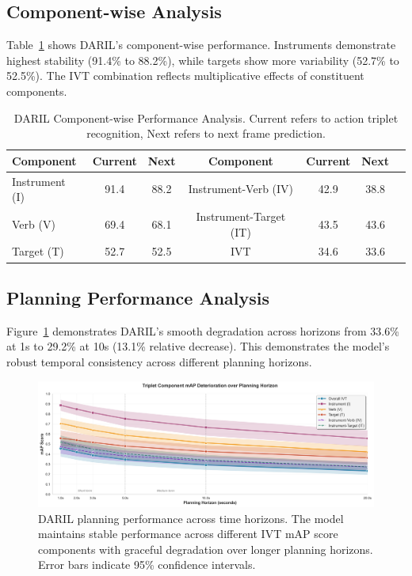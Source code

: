 \documentclass[runningheads]{llncs}
\begin{document}
\subsection{Component-wise Analysis}

Table~\ref{tab:component_analysis} shows DARIL's component-wise performance. Instruments demonstrate highest stability (91.4\% to 88.2\%), while targets show more variability (52.7\% to 52.5\%). The IVT combination reflects multiplicative effects of constituent components.

\begin{table}[h]
\centering
\caption{DARIL Component-wise Performance Analysis. Current refers to action triplet recognition, Next refers to next frame prediction.}
\label{tab:component_analysis}
\begin{tabular}{lcccccc}
\toprule
\textbf{Component} & \textbf{Current} & \textbf{Next} & \textbf{Component} & \textbf{Current} & \textbf{Next} \\
\midrule
Instrument (I) & 91.4 & 88.2 & Instrument-Verb (IV) & 42.9 & 38.8 \\
Verb (V) & 69.4 & 68.1 & Instrument-Target (IT) & 43.5 & 43.6 \\
Target (T) & 52.7 & 52.5 & IVT & 34.6 & 33.6 \\
\bottomrule
\end{tabular}
\end{table}

\subsection{Planning Performance Analysis}

Figure~\ref{fig:planning_analysis} demonstrates DARIL's smooth degradation across horizons from 33.6\% at 1s to 29.2\% at 10s (13.1\% relative decrease). This demonstrates the model's robust temporal consistency across different planning horizons.

\begin{figure}[h]
\centering
\includegraphics[width=\textwidth]{planning_analysis_simple.png}
\caption{DARIL planning performance across time horizons. The model maintains stable performance across different IVT mAP score components with graceful degradation over longer planning horizons. Error bars indicate 95\% confidence intervals.}
\label{fig:planning_analysis}
\end{figure}
\end{document}
